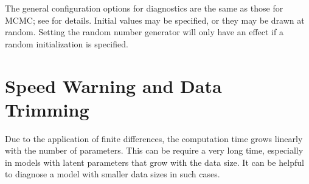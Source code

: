 The general configuration options for diagnostics are the same as
those for MCMC; see  for details. Initial
values may be specified, or they may be drawn at random. Setting the
random number generator will only have an effect if a random
initialization is specified.

\section{Speed Warning and Data Trimming}

Due to the application of finite differences, the computation time
grows linearly with the number of parameters. This can be require a
very long time, especially in models with latent parameters that grow
with the data size. It can be helpful to diagnose a model with smaller
data sizes in such cases.


